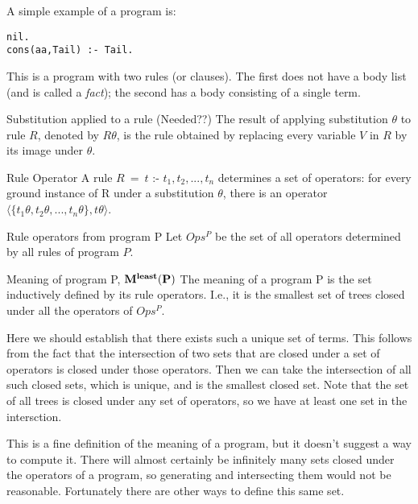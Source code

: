\begin{example}
A simple example of a program is:\\
\begin{verbatim}
nil.
cons(aa,Tail) :- Tail.
\end{verbatim}
This is a program with two rules (or clauses).  The first does not
have a body list (and is called a {\em fact}); the second has a body
consisting of a single term.
\end{example}

\begin{definition}{Substitution applied to a rule}
(Needed??)  The result of applying substitution $\theta$ to rule $R$,
  denoted by $R\theta$, is the rule obtained by replacing every
  variable $V$ in $R$ by its image under $\theta$.
\end{definition}

\begin{definition}{Rule Operator}
  A rule $R~=~t$ :- $t_1,t_2,...,t_n$ determines a set of operators:
  for every ground instance of R under a substitution $\theta$, there
  is an operator $\langle \{t_1\theta, t_2\theta, ..., t_n\theta\},
  t\theta\rangle$.
\end{definition}

\begin{definition}{Rule operators from program P}
Let $Ops^P$ be the set of all operators determined by all rules of program $P$.
\end{definition}

\begin{definition}{Meaning of program P, $\bf{M^{least}(P)}$}
  The meaning of a program P is the set inductively defined by its
  rule operators.  I.e., it is the smallest set of trees closed under
  all the operators of $Ops^P$.
\end{definition}

Here we should establish that there exists such a unique set of terms.
This follows from the fact that the intersection of two sets that are
closed under a set of operators is closed under those operators.  Then
we can take the intersection of all such closed sets, which is unique,
and is the smallest closed set.  Note that the set of all trees is
closed under any set of operators, so we have at least one set in the
intersction.

This is a fine definition of the meaning of a program, but it doesn't
suggest a way to compute it.  There will almost certainly be
infinitely many sets closed under the operators of a program, so
generating and intersecting them would not be reasonable.  Fortunately
there are other ways to define this same set.


